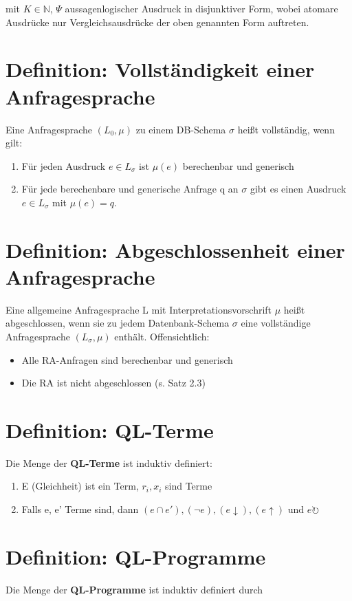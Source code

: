 \documentclass[12pt, a4paper]{article}
\begin{document}
mit $K \in \mathbb{N}$, $\Psi$ aussagenlogischer Ausdruck in disjunktiver Form, wobei atomare Ausdrücke nur Vergleichsausdrücke der oben genannten Form auftreten.


\section*{Definition: Vollständigkeit einer Anfragesprache}

Eine Anfragesprache $(L_0, \mu)$ zu einem DB-Schema $\sigma$ heißt vollständig, wenn gilt: 
\begin{enumerate}
\item Für jeden Ausdruck $e \in L_\sigma$ ist $\mu(e)$ berechenbar und generisch
\item Für jede berechenbare und generische Anfrage q an $\sigma$ gibt es einen Ausdruck $e \in L_\sigma$ mit $\mu(e) = q$.
\end{enumerate}


\section*{Definition: Abgeschlossenheit einer Anfragesprache}

Eine allgemeine Anfragesprache L mit Interpretationsvorschrift $\mu$ heißt abgeschlossen, wenn sie zu jedem Datenbank-Schema $\sigma$ eine vollständige Anfragesprache $(L_\sigma, \mu)$ enthält.
Offensichtlich: 
\begin{itemize}
\item Alle RA-Anfragen sind berechenbar und generisch
\item Die RA ist nicht abgeschlossen (s. Satz 2.3)
\end{itemize}


\section*{Definition: QL-Terme}
Die Menge der \textbf{QL-Terme} ist induktiv definiert:
\begin{enumerate}
\item E (Gleichheit) ist ein Term, $r_i, x_i$ sind Terme
\item Falls e, e' Terme sind, dann $(e \cap e'), (\lnot e), (e \downarrow), (e \uparrow) \text{ und } e\circlearrowright$
\end{enumerate}


\section*{Definition: QL-Programme}
Die Menge der \textbf{QL-Programme} ist induktiv definiert durch
\end{document}
